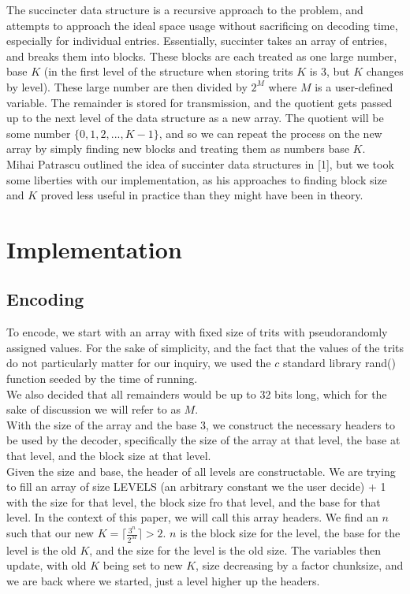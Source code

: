 \documentclass{article}
\begin{document}
\indent The succincter data structure is a recursive approach to the problem, and attempts to approach the ideal space usage without sacrificing on decoding time, especially for individual entries. Essentially, succinter takes an array of entries, and breaks them into blocks. These blocks are each treated as one large number, base $K$ (in the first level of the structure when storing trits $K$ is 3, but $K$ changes by level). These large number are then divided by $2^M$ where $M$ is a user-defined variable. The remainder is stored for transmission, and the quotient gets passed up to the next level of the data structure as a new array. The quotient will be some number $\{0 , 1, 2, ... , K -1\}$, and so we can repeat the process on the new array by simply finding new blocks and treating them as numbers base $K$.\\

\indent Mihai Patrascu outlined the idea of succinter data structures in [1], but we took some liberties with our implementation, as his approaches to finding block size and $K$ proved less useful in practice than they might have been in theory.\\

\noindent \section{Implementation}
\noindent \subsection{Encoding}
To encode, we start with an array with fixed size of trits with pseudorandomly assigned values. For the sake of simplicity, and the fact that the values of the trits do not particularly matter for our inquiry, we used the $c$ standard library rand() function seeded by the time of running. \\

We also decided that all remainders would be up to 32 bits long, which for the sake of discussion we will refer to as $M$.\\

With the size of the array and the base 3, we construct the necessary headers to be used by the decoder, specifically the size of the array at that level, the base at that level, and the block size at that level. \\

Given the size and base, the header of all levels are constructable. We are trying to fill an array of size LEVELS (an arbitrary constant we the user decide) + 1 with the size for that level, the block size fro that level, and the base for that level. In the context of this paper, we will call this array headers. We find an $n$ such that our new $K = \lceil \frac{3^n}{2^M} \rceil > 2$. $n$ is the block size for the level, the base for the level is the old $K$, and the size for the level is the old size. The variables then update, with old $K$ being set to new $K$, size decreasing by a factor chunksize, and we are back where we started, just a level higher up the headers.\\
\end{document}
